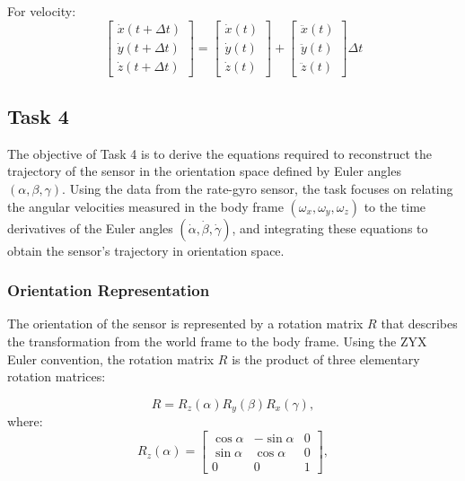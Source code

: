 \documentclass[12pt]{article}
\begin{document}
For velocity:
\[
\begin{bmatrix} \dot{x}(t + \Delta t) \\ \dot{y}(t + \Delta t) \\ \dot{z}(t + \Delta t) \end{bmatrix}
= 
\begin{bmatrix} \dot{x}(t) \\ \dot{y}(t) \\ \dot{z}(t) \end{bmatrix}
+ 
\begin{bmatrix} \ddot{x}(t) \\ \ddot{y}(t) \\ \ddot{z}(t) \end{bmatrix} \Delta t
\]







\subsection{Task 4}

The objective of Task 4 is to derive the equations required to reconstruct the trajectory of the sensor in the orientation space defined by Euler angles \((\alpha, \beta, \gamma)\). Using the data from the rate-gyro sensor, the task focuses on relating the angular velocities measured in the body frame \((\omega_x, \omega_y, \omega_z)\) to the time derivatives of the Euler angles \((\dot{\alpha}, \dot{\beta}, \dot{\gamma})\), and integrating these equations to obtain the sensor's trajectory in orientation space.

\subsubsection{Orientation Representation}

The orientation of the sensor is represented by a rotation matrix \(R\) that describes the transformation from the world frame to the body frame. Using the ZYX Euler convention, the rotation matrix \(R\) is the product of three elementary rotation matrices:

\begin{equation}
\label{eq:R_combined_task4}
R = R_z(\alpha) R_y(\beta) R_x(\gamma),
\end{equation}
where:
\begin{equation}
\label{eq:Rz}
R_z(\alpha) =
\begin{bmatrix}
\cos\alpha & -\sin\alpha & 0 \\
\sin\alpha & \cos\alpha & 0 \\
0 & 0 & 1
\end{bmatrix},
\end{equation}
\end{document}
